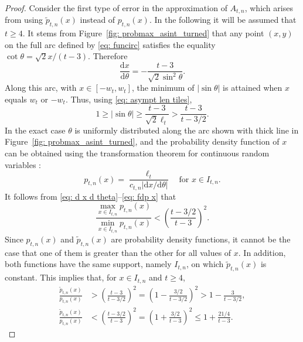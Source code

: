 \documentclass[12pt, a4paper]{article}
\newcommand{\diff}{\mathrm d}
\newcommand{\len}{\ell} %
\newcommand{\tiles}{t} %
\newcommand{\fdp}{p}
\newcommand{\intervx}{I}
\begin{document}
\begin{proof}
Consider the first type of error in the approximation of $A_{\tiles,n}$, which arises from using $\tilde \fdp_{\tiles,n}(x)$ instead of $\fdp_{\tiles,n}(x)$. In the following it will be assumed that $\tiles \geq 4$. It stems from Figure~\ref{fig: probmax_asint_turned} that any point $(x,y)$ on the full arc defined by \eqref{eq: funcirc} satisfies the equality $\cot \theta = \sqrt{2} x /(\tiles-3)$. Therefore
\begin{equation}
\label{eq: d x d theta}
\frac{\diff x}{\diff \theta} = -\frac{\tiles-3}{\sqrt{2} \sin^2 \theta}.
\end{equation}
Along this arc, with $x \in [-w_\tiles, w_\tiles]$, the minimum of $|\sin \theta|$ is attained when $x$ equals $w_\tiles$ or $-w_\tiles$. Thus, using \eqref{eq: asympt len tiles},
\begin{equation}
\label{eq: sin theta bound}
1 \geq |\sin \theta| \geq \frac{\tiles-3}{\sqrt{2}\len_\tiles} > \frac{\tiles-3}{\tiles-3/2}.
\end{equation}
In the exact case $\theta$ is uniformly distributed along the arc shown with thick line in Figure~\ref{fig: probmax_asint_turned}, and the probability density function of $x$ can be obtained using the transformation theorem for continuous random variables \cite[section~5.2]{Papoulis91}:
\begin{equation}
\label{eq: fdp x}
\fdp_{\tiles,n}(x) = \frac {\len_\tiles} {c_{\tiles,n} |\diff x / \diff \theta|} \quad\text{for } x \in \intervx_{\tiles,n}.
\end{equation}
It follows from \eqref{eq: d x d theta}--\eqref{eq: fdp x} that
\begin{equation}
\label{eq: max min tilde pdf}
\frac {\max_{x \in \intervx_{\tiles,n}} \fdp_{\tiles,n}(x)} {\min_{x \in \intervx_{\tiles,n}} \fdp_{\tiles,n}(x)} < \left(\frac{\tiles-3/2}{\tiles-3}\right)^2.
\end{equation}
Since $\fdp_{\tiles,n}(x)$ and $\tilde\fdp_{\tiles,n}(x)$ are probability density functions, it cannot be the case that one of them is greater than the other for all values of $x$. In addition, both functions have the same support, namely $\intervx_{\tiles,n}$, on which $\tilde \fdp_{\tiles,n}(x)$ is constant. This implies that, for $x \in \intervx_{\tiles,n}$ and $\tiles \geq 4$,
\begin{align}
\label{eq: tilde pdf pdf bound >}
\frac {\tilde \fdp_{\tiles,n}(x)} {\fdp_{\tiles,n}(x)} &> \left(\frac{\tiles-3}{\tiles-3/2}\right)^2 = \left(1-\frac{3/2}{\tiles-3/2}\right)^2 > 1 - \frac 3 {\tiles-3/2}, \\
\label{eq: tilde pdf pdf bound <}
\frac {\tilde \fdp_{\tiles,n}(x)} {\fdp_{\tiles,n}(x)} &< \left(\frac{\tiles-3/2}{\tiles-3}\right)^2 = \left(1+\frac{3/2}{\tiles-3}\right)^2 \leq 1 + \frac {21/4} {\tiles-3}.
\end{align}


\end{proof}
\end{document}
